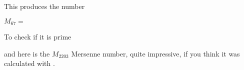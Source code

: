 This produces the number 

$M_{67}=$





To check if it is prime

\begin{teXXX}
\npthousandsep{ }
\end{teXXX}




and here is the $M_{2203}$ Mersenne number, quite impressive, if you think it was calculated with \tex.

%
%
%
%

%
%




